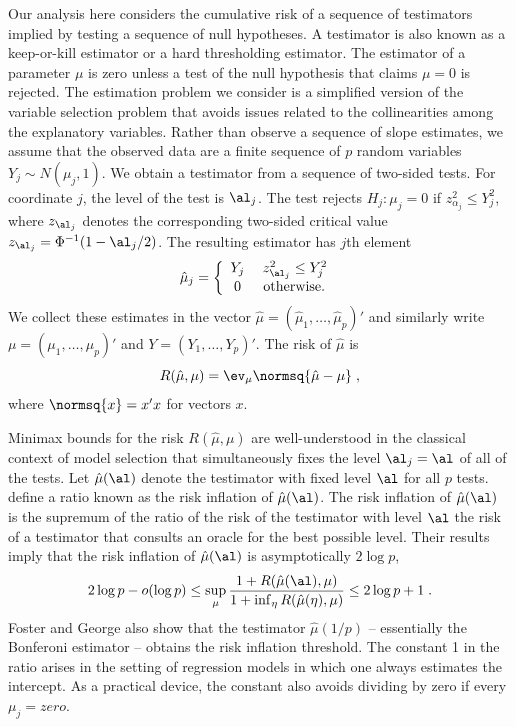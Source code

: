 \documentclass[12pt]{article}
\begin{document}
 Our analysis here considers the cumulative risk of a sequence of testimators
 implied by testing a sequence of null hypotheses.  A testimator is also known
 as a keep-or-kill estimator or a hard thresholding estimator.  The estimator of
 a parameter $\mu$ is zero unless a test of the null hypothesis that claims $\mu
 = 0$ is rejected.  The estimation problem we consider is a simplified version
 of the variable selection problem that avoids issues related to the
 collinearities among the explanatory variables.  Rather than observe a sequence
 of slope estimates, we assume that the observed data are a finite sequence of
 $p$ random variables $Y_j \sim N(\mu_j,1)$.  We obtain a testimator from a
 sequence of two-sided tests.  For coordinate $j$, the level of the test is
 $\al_j$.  The test rejects $H_j: \mu_j = 0$ if $z_{\alpha_j}^2 \le Y_j^2$,
 where $z_{\al_j}$ denotes the corresponding two-sided critical value $z_{\al_j}
 = \Phi^{-1}(1-\al_j/2)$.  The resulting estimator has $j$th element
 \begin{equation}
    \hat\mu_j = \left\{
      \begin{array}{cc}
            Y_j  & z_{\al_j}^2 \le Y_j^2 \cr
            0  & \mbox{ otherwise. }
      \end{array} \right.
 \label{eq:muhat}
 \end{equation}
 We collect these estimates in the vector $\hat\mu = (\hat\mu_1, \ldots,
 \hat\mu_p)'$ and similarly write $\mu = (\mu_1, \ldots, \mu_p)'$ and $Y = (Y_1,
 \ldots, Y_p)'$.  The risk of $\hat\mu$ is
 \begin{equation}
    R(\hat\mu, \mu) 
      = \ev_\mu \normsq{\hat\mu - \mu} \;,
 \label{eq:risk}
 \end{equation}
 where $\normsq{x} = x'x$ for vectors $x$.


 Minimax bounds for the risk $R(\hat\mu,\mu)$ are well-understood in the
 classical context of model selection that simultaneously fixes the level $\al_j
 = \al$ of all of the tests.  Let $\hat\mu(\al)$ denote the testimator with
 fixed level $\al$ for all $p$ tests.  \citet{fostergeorge94} define a ratio
 known as the risk inflation of $\hat\mu(\al)$. \citep[][obtain similar
 results.]{donohojohnstone94} The risk inflation of $\hat\mu(\al)$ is the
 supremum of the ratio of the risk of the testimator with level $\al$ the risk
 of a testimator that consults an oracle for the best possible level.  Their
 results imply that the risk inflation of $\hat\mu(\al)$ is asymptotically $2
 \log p$,
 \begin{equation}
    2 \log p - o(\log p) 
    \le
    \sup_\mu  \frac{1 + R(\hat\mu(\al), \mu)}
                   {1 + \inf_\eta{R(\hat\mu(\eta), \mu)}}  
    \le 
    2 \log p + 1 \;.
 \label{eq:ri}
 \end{equation}
 Foster and George also show that the testimator $\hat\mu(1/p)$ -- essentially
 the Bonferoni estimator -- obtains the risk inflation threshold.  The constant
 1 in the ratio arises in the setting of regression models in which one always
 estimates the intercept.  As a practical device, the constant also avoids
 dividing by zero if every $\mu_j = zero$.
\end{document}
